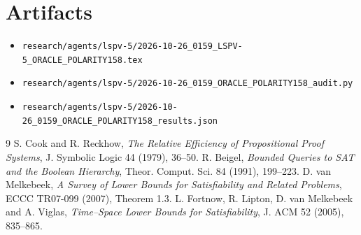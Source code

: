 \documentclass[11pt]{article}
\begin{document}
\section*{Artifacts}
\begin{itemize}
  \item \texttt{research/agents/lspv-5/2026-10-26\_0159\_LSPV-5\_ORACLE\_POLARITY158.tex}
  \item \texttt{research/agents/lspv-5/2026-10-26\_0159\_ORACLE\_POLARITY158\_audit.py}
  \item \texttt{research/agents/lspv-5/2026-10-26\_0159\_ORACLE\_POLARITY158\_results.json}
\end{itemize}

\begin{thebibliography}{9}
 S. Cook and R. Reckhow, \emph{The Relative Efficiency of Propositional Proof Systems}, J. Symbolic Logic 44 (1979), 36--50.
 R. Beigel, \emph{Bounded Queries to SAT and the Boolean Hierarchy}, Theor. Comput. Sci. 84 (1991), 199--223.
 D. van Melkebeek, \emph{A Survey of Lower Bounds for Satisfiability and Related Problems}, ECCC TR07-099 (2007), Theorem 1.3.
 L. Fortnow, R. Lipton, D. van Melkebeek and A. Viglas, \emph{Time--Space Lower Bounds for Satisfiability}, J. ACM 52 (2005), 835--865.
\end{thebibliography}

\end{document}
